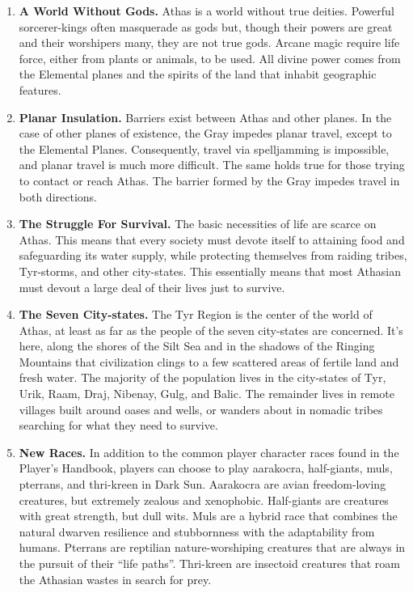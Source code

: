 \begin{enumerate}
\item \textbf{A World Without Gods.} Athas is a world without true deities. Powerful sorcerer-kings often masquerade as gods but, though their powers are great and their worshipers many, they are not true gods. Arcane magic require life force, either from plants or animals, to be used. All divine power comes from the Elemental planes and the spirits of the land that inhabit geographic features.
\item \textbf{Planar Insulation.} Barriers exist between Athas and other planes. In the case of other planes of existence, the Gray impedes planar travel, except to the Elemental Planes. Consequently, travel via spelljamming is impossible, and planar travel is much more difficult. The same holds true for those trying to contact or reach Athas. The barrier formed by the Gray impedes travel in both directions.
\item \textbf{The Struggle For Survival.} The basic necessities of life are scarce on Athas. This means that every society must devote itself to attaining food and safeguarding its water supply, while protecting themselves from raiding tribes, Tyr-storms, and other city-states. This essentially means that most Athasian must devout a large deal of their lives just to survive.
\item \textbf{The Seven City-states.} The Tyr Region is the center of the world of Athas, at least as far as the people of the seven city-states are concerned. It's here, along the shores of the Silt Sea and in the shadows of the Ringing Mountains that civilization clings to a few scattered areas of fertile land and fresh water. The majority of the population lives in the city-states of Tyr, Urik, Raam, Draj, Nibenay, Gulg, and Balic. The remainder lives in remote villages built around oases and wells, or wanders about in nomadic tribes searching for what they need to survive.
\item \textbf{New Races.} In addition to the common player character races found in the Player's Handbook, players can choose to play aarakocra, half-giants, muls, pterrans, and thri-kreen in {\tableheader Dark Sun}. Aarakocra are avian freedom-loving creatures, but extremely zealous and xenophobic. Half-giants are creatures with great strength, but dull wits. Muls are a hybrid race that combines the natural dwarven resilience and stubbornness with the adaptability from humans. Pterrans are reptilian nature-worshiping creatures that are always in the pursuit of their ``life paths''. Thri-kreen are insectoid creatures that roam the Athasian wastes in search for prey.
\end{enumerate}

